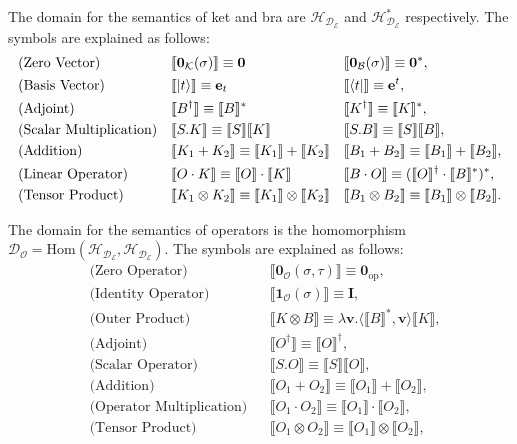 \documentclass[manuscript, review, timestamp]{acmart}
\newcommand*{\sem}[1]{\llbracket #1 \rrbracket}
\begin{document}
\begin{definition}
  The domain for the semantics of ket and bra are $\mathcal{H}_{\mathcal{D}_\mathcal{E}}$ and $\mathcal{H}_{\mathcal{D}_\mathcal{E}}^*$ respectively.
  The symbols are explained as follows:
  \begin{align*}
    & \text{(Zero Vector)} &&
    \sem{\mathbf{0}_\mathcal{K}(\sigma)} \equiv \mathbf{0} && \sem{\mathbf{0}_\mathcal{B}(\sigma)} \equiv \mathbf{0}^*, \\
    & \text{(Basis Vector)} &&
    \sem{\ket{t}} \equiv \mathbf{e}_t && \sem{\bra{t}} \equiv \mathbf{e}^t, \\
    & \text{(Adjoint)} &&
    \sem{B^\dagger} \equiv \sem{B}^* && \sem{K^\dagger} \equiv \sem{K}^*, \\
    & \text{(Scalar Multiplication)} &&
    \sem{S.K} \equiv \sem{S} \sem{K} && \sem{S.B} \equiv \sem{S} \sem{B}, \\
    & \text{(Addition)} &&
    \sem{K_1 + K_2} \equiv \sem{K_1} + \sem{K_2} && \sem{B_1 + B_2} \equiv \sem{B_1} + \sem{B_2}, \\
    & \text{(Linear Operator)} &&
    \sem{O \cdot K} \equiv \sem{O} \cdot \sem{K} && \sem{B \cdot O} \equiv (\sem{O}^\dagger \cdot \sem{B}^*)^*, \\
    & \text{(Tensor Product)} &&
    \sem{K_1 \otimes K_2} \equiv \sem{K_1} \otimes \sem{K_2} && \sem{B_1 \otimes B_2} \equiv \sem{B_1} \otimes \sem{B_2}.
  \end{align*}
\end{definition}



\begin{definition}
  The domain for the semantics of operators is the homomorphism $\mathcal{D}_\mathcal{O} = \textrm{Hom}(\mathcal{H}_{\mathcal{D}_\mathcal{E}}, \mathcal{H}_{\mathcal{D}_\mathcal{E}})$.
  The symbols are explained as follows:
  \begin{align*}
    & \text{(Zero Operator)} &&
    \sem{\mathbf{0}_\mathcal{O}(\sigma, \tau)} \equiv \mathbf{0}_{\textrm{op}}, \\
    & \text{(Identity Operator)} &&
    \sem{\mathbf{1}_\mathcal{O}(\sigma)} \equiv \mathbf{I}, \\
    & \text{(Outer Product)} &&
    \sem{K \otimes B} \equiv \lambda \mathbf{v}. \langle \sem{B}^*, \mathbf{v}\rangle \sem{K}, \\
    & \text{(Adjoint)} &&
    \sem{O^\dagger} \equiv \sem{O}^\dagger, \\
    & \text{(Scalar Operator)} &&
    \sem{S.O} \equiv \sem{S} \sem{O}, \\
    & \text{(Addition)} &&
    \sem{O_1 + O_2} \equiv \sem{O_1}+\sem{O_2}, \\
    & \text{(Operator Multiplication)} &&
    \sem{O_1 \cdot O_2} \equiv \sem{O_1} \cdot \sem{O_2}, \\
    & \text{(Tensor Product)} &&
    \sem{O_1 \otimes O_2} \equiv \sem{O_1} \otimes \sem{O_2},
  \end{align*}
\end{definition}
\end{document}
